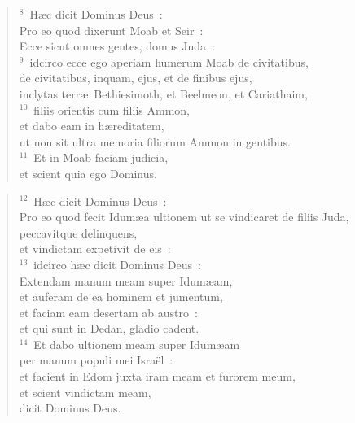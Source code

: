 \begin{flushleft}\begin{verse}${}^{8}$~H\ae c dicit Dominus Deus~:\\ Pro eo quod dixerunt Moab et Seir~:\\ Ecce sicut omnes gentes, domus Juda~:\\
${}^{9}$~idcirco ecce ego aperiam humerum Moab de civitatibus,\\ de civitatibus, inquam, ejus, et de finibus ejus,\\ inclytas terr\ae\ Bethiesimoth, et Beelmeon, et Cariathaim,\\
${}^{10}$~filiis orientis cum filiis Ammon,\\ et dabo eam in h\ae reditatem,\\ ut non sit ultra memoria filiorum Ammon in gentibus.\\
${}^{11}$~Et in Moab faciam judicia,\\ et scient quia ego Dominus.\end{verse}\end{flushleft}


\begin{flushleft}\begin{verse}${}^{12}$~H\ae c dicit Dominus Deus~:\\ Pro eo quod fecit Idum\ae a ultionem ut se vindicaret de filiis Juda,\\ peccavitque delinquens,\\ et vindictam expetivit de eis~:\\
${}^{13}$~idcirco h\ae c dicit Dominus Deus~:\\ Extendam manum meam super Idum\ae am,\\ et auferam de ea hominem et jumentum,\\ et faciam eam desertam ab austro~:\\ et qui sunt in Dedan, gladio cadent.\\
${}^{14}$~Et dabo ultionem meam super Idum\ae am\\ per manum populi mei Isra\"el~:\\ et facient in Edom juxta iram meam et furorem meum,\\ et scient vindictam meam,\\ dicit Dominus Deus.\end{verse}\end{flushleft}


